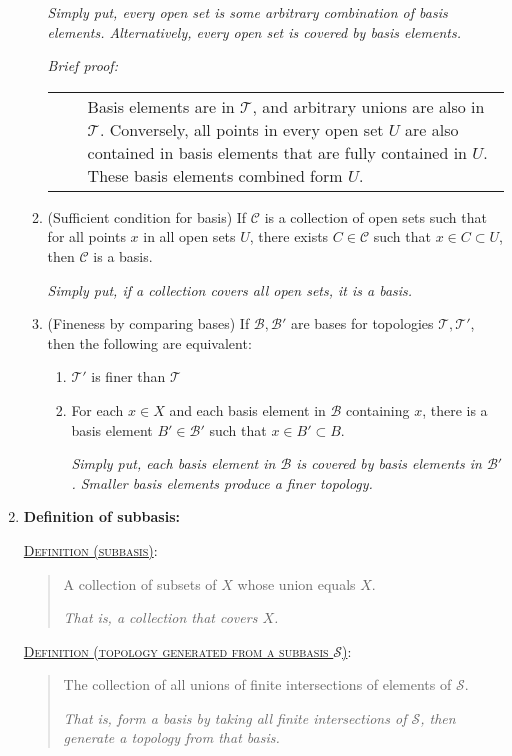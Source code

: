 \documentclass[letterpaper, 12pt]{book}
\newcommand{\ms}[1]{\mathscr{#1}}
\newcommand{\defn}[2]{\textsc{\underline{Definition (#1)}:}\begin{quote} #2\end{quote}}
\newenvironment{briefproof}{\footnotesize\begin{flushleft}\textit{Brief proof:}\par\begin{tabular}{l|p{0.8\textwidth}}$\quad$&}{\\
    \end{tabular}\end{flushleft}}
\begin{document}
\begin{enumerate}[resume]
\begin{enumerate}
                \textit{Simply put, every open set is some arbitrary combination of basis elements. Alternatively, every open set is covered by basis elements.}
                \begin{briefproof}
                Basis elements are in $\ms{T}$, and arbitrary unions are also in $\ms{T}$. Conversely, all points in every open set $U$ are also contained in basis elements that are fully contained in $U$. These basis elements combined form $U$.
                \end{briefproof}

                \item (Sufficient condition for basis) If $\ms{C}$ is a collection of open sets such that for all points $x$ in all open sets $U$, there exists $C\in\ms{C}$ such that $x\in C\subset U$, then $\ms{C}$ is a basis.

                \textit{Simply put, if a collection covers all open sets, it is a basis.}

                \item (Fineness by comparing bases) If $\ms{B}, \ms{B'}$ are bases for topologies $\ms{T}, \ms{T'}$, then the following are equivalent:
                \begin{enumerate}
                    \item $\ms{T'}$ is finer than $\ms{T}$
                    \item For each $x\in X$ and each basis element in $\ms{B}$ containing $x$, there is a basis element $B'\in\ms{B'}$ such that $x\in B' \subset B$.

                    \textit{Simply put, each basis element in $\ms{B}$ is covered by basis elements in $\ms{B'}$. Smaller basis elements produce a finer topology.}
                \end{enumerate}
            \end{enumerate}
        \item \textbf{Definition of subbasis:}

            \defn{subbasis}{A collection of subsets of $X$ whose union equals $X$.\par\textit{That is, a collection that covers $X$.}}
            \defn{topology generated from a subbasis $\ms{S}$}{The collection of all unions of finite intersections of elements of $\ms{S}$.\par\textit{That is, form a basis by taking all finite intersections of $\ms{S}$, then generate a topology from that basis.}}
        \end{enumerate}
\end{document}
